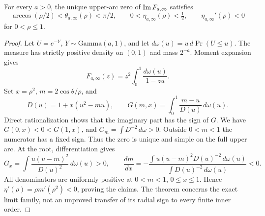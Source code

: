 \begin{theorem}
\label{rwcart:thm:left-atom}
For every $a>0$, the unique upper-arc zero of
$\operatorname{Im} F_{a,\infty}$ satisfies
\[
 \arccos(\rho/2)<\theta_{a,\infty}(\rho)<\pi/2,
 \qquad 0<\eta_{a,\infty}(\rho)<\tfrac12,
 \qquad \eta_{a,\infty}'(\rho)<0
\]
for $0<\rho\le1$.
\end{theorem}
\begin{proof}
Let $U=e^{-Y}$, $Y\sim\mathrm{Gamma}(a,1)$, and let
$d\omega(u)=u\,d\Pr(U\le u)$. The measure has strictly positive
density on $(0,1)$ and mass $2^{-a}$. Moment expansion gives
\[
 F_{a,\infty}(z)=z^2\int_0^1\frac{d\omega(u)}{1-zu}.
\]
Set $x=\rho^2$, $m=2\cos\theta/\rho$, and
\[
 D(u)=1+x(u^2-mu),\qquad
 G(m,x)=\int_0^1\frac{m-u}{D(u)}\,d\omega(u).
\]
Direct rationalization shows that the imaginary part has the sign of
$G$. We have $G(0,x)<0<G(1,x)$, and
$G_m=\int D^{-2}\,d\omega>0$. Outside $0<m<1$ the numerator has
a fixed sign. Thus the zero is unique and simple on the full upper arc.
At the root, differentiation gives
\[
 G_x=\int\frac{u(u-m)^2}{D(u)^2}\,d\omega(u)>0,
 \qquad
 \frac{dm}{dx}=-\frac{\int u(u-m)^2D(u)^{-2}\,d\omega(u)}
                       {\int D(u)^{-2}\,d\omega(u)}<0.
\]
All denominators are uniformly positive at $0<m<1$, $0\le x\le1$.
Hence $\eta'(\rho)=\rho m'(\rho^2)<0$, proving the claims.
The theorem concerns the exact limit family, not an unproved transfer
of its radial sign to every finite inner order.
\end{proof}
